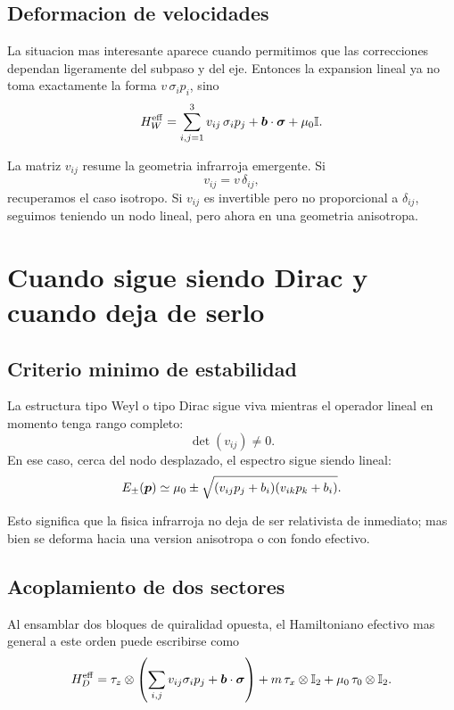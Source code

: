 \subsection{Deformacion de velocidades}
La situacion mas interesante aparece cuando permitimos que las correcciones dependan ligeramente del subpaso y del eje. Entonces la expansion lineal ya no toma exactamente la forma \(v\,\sigma_i p_i\), sino
\begin{equation}
H_W^{\mathrm{eff}}
=
\sum_{i,j=1}^3 v_{ij}\,\sigma_i p_j
+\bm{b}\cdot\bm{\sigma}
+\mu_0\mathbb{I}.
\label{c24:eq:anisotropicWeyl}
\end{equation}

La matriz \(v_{ij}\) resume la geometria infrarroja emergente. Si
\begin{equation}
v_{ij}=v\,\delta_{ij},
\end{equation}
recuperamos el caso isotropo. Si \(v_{ij}\) es invertible pero no proporcional a \(\delta_{ij}\), seguimos teniendo un nodo lineal, pero ahora en una geometria anisotropa.

\section{Cuando sigue siendo Dirac y cuando deja de serlo}
\subsection{Criterio minimo de estabilidad}
La estructura tipo Weyl o tipo Dirac sigue viva mientras el operador lineal en momento tenga rango completo:
\begin{equation}
\det(v_{ij})\neq 0.
\end{equation}
En ese caso, cerca del nodo desplazado, el espectro sigue siendo lineal:
\begin{equation}
E_\pm(\bm{p})\simeq \mu_0 \pm \sqrt{(v_{ij}p_j+b_i)(v_{ik}p_k+b_i)}.
\end{equation}

Esto significa que la fisica infrarroja no deja de ser relativista de inmediato; mas bien se deforma hacia una version anisotropa o con fondo efectivo.

\subsection{Acoplamiento de dos sectores}
Al ensamblar dos bloques de quiralidad opuesta, el Hamiltoniano efectivo mas general a este orden puede escribirse como
\begin{equation}
H_D^{\mathrm{eff}}
=
\tau_z\otimes\left(\sum_{i,j}v_{ij}\sigma_i p_j + \bm{b}\cdot\bm{\sigma}\right)
+ m\,\tau_x\otimes\mathbb{I}_2
+ \mu_0\,\tau_0\otimes\mathbb{I}_2.
\label{c24:eq:DiracDeformed}
\end{equation}

